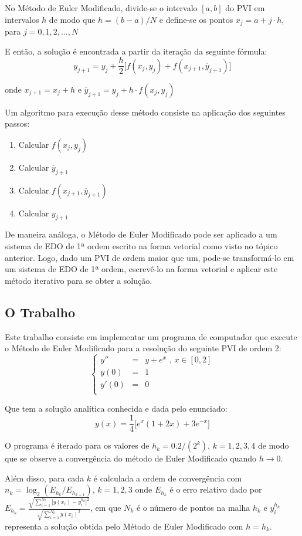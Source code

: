 No Método de Euler Modificado, divide-se o intervalo $[a,b]$ do PVI em intervalos $h$ de modo que $h = (b - a) / N$
e define-se os pontos $x_j = a + j \cdot h$, para $j = 0, 1, 2, \dots, N$

E então, a solução é encontrada a partir da iteração da seguinte fórmula:
\[
	y_{j+1} = y_j + \frac{h}{2} \Big[f(x_j, y_j) + f(x_{j+1}, \overline{y}_{j+1})\Big]
\]

onde $x_{j+1} = x_j + h$ e $\overline{y}_{j+1} = y_j + h \cdot f(x_j, y_j)$

Um algoritmo para execução desse método consiste na aplicação dos seguintes passos:
\begin{enumerate}
	\item Calcular $f(x_{j}, y_{j})$
	\item Calcular $\overline{y}_{j+1}$
	\item Calcular $f(x_{j+1}, \overline{y}_{j+1})$
	\item Calcular $y_{j+1}$
\end{enumerate}

De maneira análoga, o Método de Euler Modificado pode ser aplicado a um sistema de EDO de 1ª ordem
escrito na forma vetorial como visto no tópico anterior. Logo, dado um PVI de ordem maior que um, pode-se
transformá-lo em um sistema de EDO de 1ª ordem, escrevê-lo na forma vetorial e aplicar este método iterativo
para se obter a solução.

\subsection{O Trabalho}

Este trabalho consiste em implementar um programa de computador que execute o Método de Euler Modificado
para a resolução do seguinte PVI de ordem 2: 
\[
	\left \{
		\begin{array}{llll}
			y''   & = & y + e^{x} \text{ , } x \in [0, 2] \\
			y(0)  & = & 1 \\
			y'(0) & = & 0 \\
		\end{array}
	\right .
\]

\newpage

Que tem a solução analítica conhecida e dada pelo enunciado:
\[
	y(x) = \frac{1}{4} \Big[ e^{x}(1 + 2x) + 3e^{-x} \Big]
\]

O programa é iterado para os valores de $h_k = 0.2/(2^k)$, $k = 1, 2, 3, 4$ de modo que se observe
a convergência do método de Euler Modificado quando $h \rightarrow 0$.

Além disso, para cada $k$ é calculada a ordem de convergência com $n_k = \log_2(E_{h_k} / E_{h_{k+1}})$, $k = 1, 2, 3$
onde $E_{h_k}$ é o erro relativo dado por
$E_{h_k} = \frac{ \sqrt{\sum_{i=1}^{N_k} \big[ y(x_i) - y_i^{h_k} \big]^2} }{ \sqrt{\sum_{i=1}^{N_k} y(x_i)^2} }$, 
em que $N_k$ é o número de pontos na malha $h_k$ e $y_i^{h_k}$ representa a solução obtida pelo Método de
Euler Modificado com $h = h_k$.

